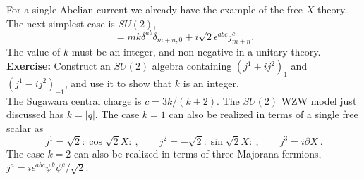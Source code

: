 For a single Abelian current we already have the example of the
free $X$ theory.  The next simplest case is $SU(2)$,
\begin{equation}
[j^a_m, j^b_n] = m k \delta^{ab} \delta_{m+n,0} + i
\sqrt 2\epsilon^{abc} j^c_{m+n}.
\end{equation}
The value of $k$ must be an integer, and non-negative in a unitary
theory.\\[3pt]
{\bf Exercise:} Construct an $SU(2)$ algebra containing
$(j^1 + i j^2)_{1}$ and $(j^1 - i j^2)_{-1}$, and use it to show
that $k$ is an integer.\\[3pt]
The Sugawara central charge is $c = 3k/(k+2)$.
The $SU(2)$ WZW model just discussed has $k = |q|$.  The case $k
= 1$ can also be realized in terms of a single free scalar as
\begin{equation}
j^1 = \sqrt{2} :\! \cos\sqrt 2 X \! :\ , \qquad
j^2 = -\sqrt{2} :\! \sin\sqrt 2 X \! :\ , \qquad
j^3 = i \partial X\ .
\end{equation}
The case $k=2$ can also be realized in terms of three Majorana
fermions, $j^a = i \epsilon^{abc} \psi^b \psi^c / \sqrt{2}$.


